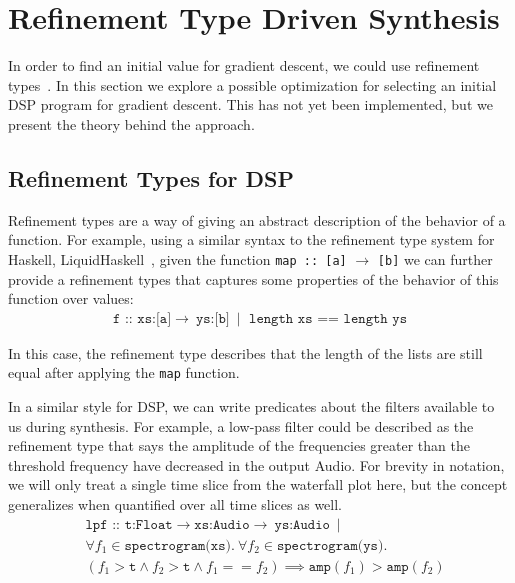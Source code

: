 \section{Refinement Type Driven Synthesis}
\label{sec:rtypes}

In order to find an initial value for gradient descent, we could use refinement types~\cite{freeman1991refinement}.
In this section we explore a possible optimization for selecting an initial DSP program for gradient descent.
This has not yet been implemented, but we present the theory behind the approach.

\subsection{Refinement Types for DSP}
\label{sec:rtypeSearch}
Refinement types are a way of giving an abstract description of the behavior of a function. 
For example, using a similar syntax to the refinement type system for Haskell, LiquidHaskell~\cite{vazou2014refinement}, given the function 
%
\texttt{map :: [a]} $\to$ \texttt{[b]}
%
we can further provide a refinement types that captures some properties of the behavior of this function over values:
%
\begin{align*}
\texttt{f :: xs:[a]} \to\ \texttt{ys:[b]}\ \mid \texttt{ length xs == length ys}
\end{align*}

\noindent In this case, the refinement type describes that the length of the lists are still equal after applying the \texttt{map} function.

In a similar style for DSP, we can write predicates about the filters available to us during synthesis. 
For example, a low-pass filter could be described as the refinement type that says the amplitude of the frequencies greater than the threshold frequency have decreased in the output Audio.
For brevity in notation, we will only treat a single time slice from the waterfall plot here, but the concept generalizes when quantified over all time slices as well.
%
\begin{align*}
  &\texttt{lpf :: t:Float} \to  \texttt{xs:Audio} \to\ \texttt{ys:Audio}\ \mid \\
  &\forall f_1 \in  \texttt{spectrogram(xs)}.\ \forall f_2 \in \texttt{spectrogram(ys)}. \\
  &(f_1 > \texttt{t}  \land  f_2 > \texttt{t}  \land f_1 == f_2) \implies \texttt{amp}(f_1) > \texttt{amp}(f_2)
\end{align*}

